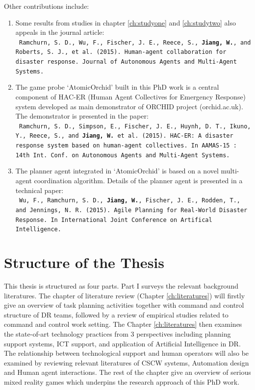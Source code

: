 Other contributions include:

\begin{enumerate}
\item Some results from studies in chapter \ref{ch:studyone} and \ref{ch:studytwo} also appeals in the journal article:\\
\texttt{ \footnotesize Ramchurn, S. D., Wu, F., Fischer, J. E., Reece, S., \textbf{Jiang, W.}, and Roberts, S. J., et al. (2015). Human-agent collaboration for disaster response. Journal of Autonomous Agents and Multi-Agent Systems.}\\

\item The game probe `AtomicOrchid' built in this PhD work is a central component of HAC-ER (Human Agent Collectives for Emergency Response) system  developed as main demonstrator of ORCHID project (orchid.ac.uk). The demonstrator is presented in the paper:\\
\texttt{ \footnotesize Ramchurn, S. D., Simpson, E., Fischer, J. E., Huynh, D. T., Ikuno, Y., Reece, S., and \textbf{ Jiang, W.} et al. (2015). HAC-ER: A disaster response system based on human-agent collectives. In AAMAS-15 : 14th Int. Conf. on Autonomous Agents and Multi-Agent Systems.} \\ 

\item The planner agent integrated in `AtomicOrchid' is based on a novel multi-agent coordination algorithm. Details of the planner agent is presented in a technical paper:\\
 \texttt{ \footnotesize Wu, F., Ramchurn, S. D., \textbf{Jiang, W.}, Fischer, J. E., Rodden, T., and Jennings, N. R. (2015). Agile Planning for Real-World Disaster Response. In International Joint Conference on Artifical Intelligence.}

\end{enumerate} 

\section{Structure of the Thesis}
This thesis is structured as four parts. Part I surveys the relevant background literatures. The chapter of literature review (Chapter \ref{ch:literatures}) will firstly give an overview of task planning activities together with command and control structure of \ac{DR} teams, followed by a review of empirical studies related to command and control work setting. The Chapter \ref{ch:literatures} then examines the state-of-art technology practices from 3 perspectives including planning support systems, \ac{ICT} support, and application of Artificial Intelligence in DR. The relationship between technological support and human operators will also be examined by reviewing relevant literatures of \ac{CSCW} systems, Automation design and Human agent interactions. The rest of the chapter give an overview of serious mixed reality games which underpins the research approach of this PhD work.\\

